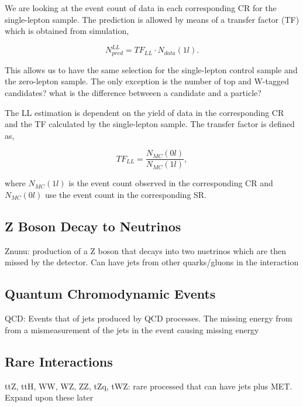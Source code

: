 We are looking at the event count of data in each corresponding CR for the single-lepton sample. The prediction is allowed by means of a transfer factor (TF) which is obtained from simulation,

\begin{equation}
\label{eqn:LLTF}
N_{pred}^{LL}=TF_{LL} \cdot N_{data}(1l).
\end{equation}

This allows us to have the same selection for the single-lepton control sample and the zero-lepton sample. The only exception is the number of top and W-tagged candidates? what is the difference betweeen a candidate and a particle?

The LL estimation is dependent on the yield of data in the corresponding CR and the TF calculated by the single-lepton sample. The transfer factor is defined as, 

\begin{equation}
\label{eqn:TF}
TF_{LL}=\frac{N_{MC}(0l)}{N_{MC}(1l)},
\end{equation}

where $N_{MC}(1l)$ is the event count observed in the corresponding CR and $N_{MC}(0l)$ use the event count in the corresponding SR. 

\subsection{Z Boson Decay to Neutrinos}
\label{subsec:Znunu}

Znunu: production of a Z boson that decays into two nuetrinos which are then missed by the detector. Can have jets from other quarks/gluons in the interaction

\subsection{Quantum Chromodynamic Events}
\label{subsec:QCD}

QCD: Events that of jets produced by QCD processes. The missing energy from from a mismeasurement of the jets in the event causing missing energy

\subsection{Rare Interactions}
\label{subsec:rare}

ttZ, ttH, WW, WZ, ZZ, tZq, tWZ: rare processed that can have jets plus MET. Expand upon these later
